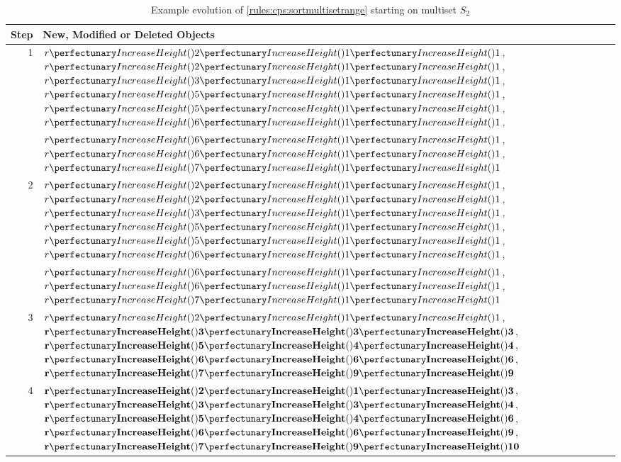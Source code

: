 \begin{table} \centering
  \begin{tabular}{|r|l|}
    \hline
    \textbf{Step} & \textbf{New, Modified or Deleted Objects} \\ \hline
    1 & \(\cpfuncnn{r}{2}{1}{1}\), \(\cpfuncnn{r}{2}{1}{1}\), \(\cpfuncnn{r}{3}{1}{1}\), \(\cpfuncnn{r}{5}{1}{1}\), \(\cpfuncnn{r}{5}{1}{1}\), \(\cpfuncnn{r}{6}{1}{1}\),\\& \(\cpfuncnn{r}{6}{1}{1}\), \(\cpfuncnn{r}{6}{1}{1}\), \(\cpfuncnn{r}{7}{1}{1}\)\\ \hline
    
    2 & \(\cpfuncnn{r}{2}{1}{1}\), \sout{\(\cpfuncnn{r}{2}{1}{1}\)}, \(\cpfuncnn{r}{3}{1}{1}\), \(\cpfuncnn{r}{5}{1}{1}\), \sout{\(\cpfuncnn{r}{5}{1}{1}\)}, \(\cpfuncnn{r}{6}{1}{1}\),\\& \sout{\(\cpfuncnn{r}{6}{1}{1}\)}, \sout{\(\cpfuncnn{r}{6}{1}{1}\)}, \(\cpfuncnn{r}{7}{1}{1}\)\\ \hline
    
    
    3 & \(\cpfuncnn{r}{2}{1}{1}\), \(\mathbf{\cpfuncnn{r}{3}{3}{3}}\), \(\mathbf{\cpfuncnn{r}{5}{4}{4}}\), \(\mathbf{\cpfuncnn{r}{6}{6}{6}}\), \(\mathbf{\cpfuncnn{r}{7}{9}{9}}\)\\ \hline
    
    4 & \(\mathbf{\cpfuncnn{r}{2}{1}{3}}\), \(\mathbf{\cpfuncnn{r}{3}{3}{4}}\), \(\mathbf{\cpfuncnn{r}{5}{4}{6}}\), \(\mathbf{\cpfuncnn{r}{6}{6}{9}}\), \(\mathbf{\cpfuncnn{r}{7}{9}{10}}\)\\ \hline
\end{tabular} 
\caption[Example evolution of \cref{rules:cps:sortmultisetrange}]{\label{tab:cps:sortmultisetrange}Example evolution of \cref{rules:cps:sortmultisetrange} starting on multiset \(S_2\)}
\end{table}


